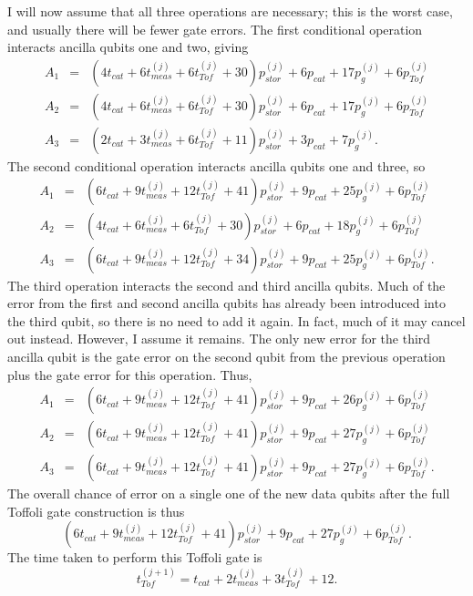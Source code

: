 \documentclass{report}
\newcommand{\ptj}[1]{p_{Tof}^{({#1})}}
\newcommand{\pgj}[1]{p_g^{({#1})}}
\newcommand{\psj}[1]{p_{stor}^{({#1})}}
\newcommand{\ttj}[1]{t_{Tof}^{({#1})}}
\newcommand{\tmj}[1]{t_{meas}^{({#1})}}
\begin{document}
I will now assume that all three operations are necessary; this is the 
worst case, and usually there will be fewer gate errors.  The first 
conditional operation interacts ancilla qubits one and two, giving
\begin{eqnarray}
A_1 & \!\! = & \!\! \left(4 t_{cat} + 6 \tmj{j} + 6 \ttj{j} + 30 \right) \psj{j}
+ 6 p_{cat} + 17 \pgj{j} + 6 \ptj{j} \\
A_2 & \!\! = & \!\! \left(4 t_{cat} + 6 \tmj{j} + 6 \ttj{j} + 30 \right) \psj{j}
+ 6 p_{cat} + 17 \pgj{j} + 6 \ptj{j} \\
A_3 & \!\! = & \!\! \left(2 t_{cat} + 3 \tmj{j} + 6 \ttj{j} + 11 \right) \psj{j}
+ 3 p_{cat} + 7 \pgj{j}.
\end{eqnarray}
The second conditional operation interacts ancilla qubits one and three, so
\begin{eqnarray}
A_1 & \!\!\!\! = & \!\!\!\! \left(6 t_{cat} + 9 \tmj{j} + 12 \ttj{j} + 41 
\right) \psj{j} + 9 p_{cat} + 25 \pgj{j} + 6 \ptj{j} \\
A_2 & \!\!\!\! = & \!\!\!\! \left(4 t_{cat} + 6 \tmj{j} + 6 \ttj{j} + 30 
\right) \psj{j} + 6 p_{cat} + 18 \pgj{j} + 6 \ptj{j} \\
A_3 & \!\!\!\! = & \!\!\!\! \left(6 t_{cat} + 9 \tmj{j} + 12 \ttj{j} + 34 
\right) \psj{j} + 9 p_{cat} + 25 \pgj{j} + 6 \ptj{j}.
\end{eqnarray}
The third operation interacts the second and third ancilla qubits.  Much of 
the error from the first and second ancilla qubits has already been 
introduced into the third qubit, so there is no need to add it again.  In fact, 
much of it may cancel out instead.  However, I assume it remains.  The 
only new error for the third ancilla qubit is the gate error on the second 
qubit from the previous operation plus the gate error for this operation.  
Thus,
\begin{eqnarray}
A_1 & \!\!\!\!\! = & \!\!\!\!\! \left(6 t_{cat} + 9 \tmj{j} + 12 \ttj{j} + 41 
\right) \psj{j} + 9 p_{cat} + 26 \pgj{j} + 6 \ptj{j} \\
A_2 & \!\!\!\!\! = & \!\!\!\!\! \left(6 t_{cat} + 9 \tmj{j} + 12 \ttj{j} + 41 
\right) \psj{j} + 9 p_{cat} + 27 \pgj{j} + 6 \ptj{j} \\
A_3 & \!\!\!\!\! = & \!\!\!\!\! \left(6 t_{cat} + 9 \tmj{j} + 12 \ttj{j} + 41 
\right) \psj{j} + 9 p_{cat} + 27 \pgj{j} + 6 \ptj{j}.
\end{eqnarray}
The overall chance of error on a single one of the new data qubits after the  
full Toffoli gate construction is thus 
\begin{equation}
\left(6 t_{cat} + 9 \tmj{j} + 12 \ttj{j} + 41 \right)
\psj{j} + 9 p_{cat} + 27 \pgj{j} + 6 \ptj{j}.
\end{equation}
The time taken to perform this Toffoli gate is
\begin{equation}
\ttj{j+1} = t_{cat} + 2 \tmj{j} + 3 \ttj{j} + 12.
\end{equation}
\end{document}
